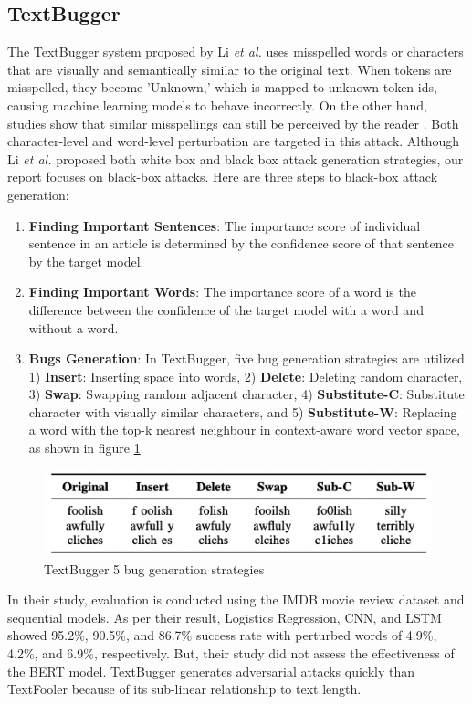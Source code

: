 \documentclass[%
	BCOR=8mm, %
	DIV=12,
	toc=bibliography, %
	toc=listof, %
	oneside, %
	egregdoesnotlikesansseriftitles, %
	]{scrbook}
\begin{document}
\subsection{TextBugger}
\label{subsection:textbugger}
The TextBugger system proposed by Li \textit{et al.} \cite{li_textbugger_2019} uses misspelled words or characters that are visually and semantically similar to the original text. When tokens are misspelled, they become 'Unknown,' which is mapped to unknown token ids, causing machine learning models to behave incorrectly. On the other hand, studies show that similar misspellings can still be perceived by the reader \cite{rawlinson_significance_2007,alzantot_generating_2018}. Both character-level and word-level perturbation are targeted in this attack. Although Li \textit{et al.} \cite{li_textbugger_2019}  proposed both white box and black box attack generation strategies, our report focuses on black-box attacks. Here are three steps to black-box attack generation:
\begin{enumerate}
    \item \textbf{Finding Important Sentences}: The importance score of individual sentence in an article is determined by the confidence score of that sentence by the target model.
    \item \textbf{Finding Important Words}: The importance score of a word is the difference between the confidence of the target model with a word and without a word.
    \item \textbf{Bugs Generation}: In TextBugger, five bug generation strategies are utilized 1) \textbf{Insert}: Inserting space into words, 2) \textbf{Delete}: Deleting random character,
    3) \textbf{Swap}: Swapping random adjacent character, 4) \textbf{Substitute-C}: Substitute character with visually similar characters, and 5)\textbf{ Substitute-W}: Replacing a word with the top-k nearest neighbour in context-aware word vector space, as shown in figure \ref{diag:textbug}
\end{enumerate}

\begin{figure}[H]
    \centering
    \includegraphics[width=.65\textwidth]{img/textbugger_5strat.png}
    \caption[Example of 5 bug generation strategies of TextBugger]{TextBugger 5 bug generation strategies \cite{li_textbugger_2019} }
    \label{diag:textbug}
\end{figure}
In their study, evaluation is conducted using the IMDB movie review dataset and sequential models. As per their result, Logistics Regression, CNN, and LSTM  showed 95.2\%, 90.5\%, and 86.7\% success rate with perturbed words of 4.9\%, 4.2\%, and 6.9\%, respectively. But, their study did not assess the effectiveness of the BERT model. TextBugger generates adversarial attacks quickly than TextFooler because of its sub-linear relationship to text length.
\end{document}
